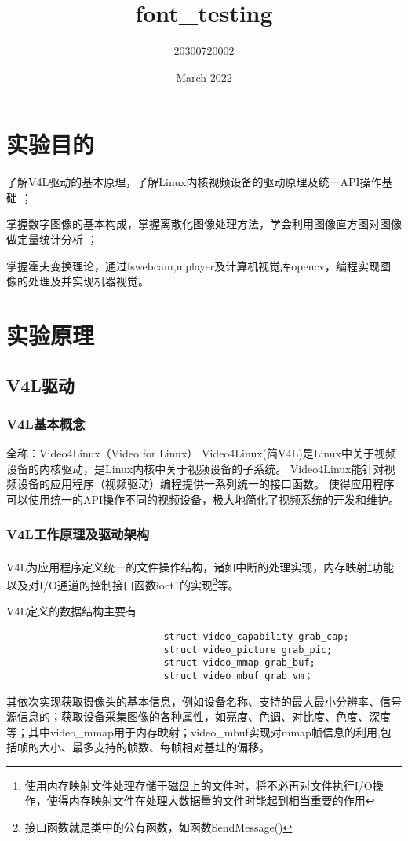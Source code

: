 \documentclass{article}
\title{font_testing}
\author{20300720002 }
\date{March 2022}
\begin{document}
\section{实验目的}
了解V4L驱动的基本原理，了解Linux内核视频设备的驱动原理及统一API操作基础
；

掌握数字图像的基本构成，掌握离散化图像处理方法，学会利用图像直方图对图像做定量统计分析
；

掌握霍夫变换理论，通过fswebcam,mplayer及计算机视觉库opencv，编程实现图像的处理及并实现机器视觉。



\section{实验原理}

\subsection{V4L驱动
}

\subsubsection{V4L基本概念}
全称：Video4Linux（Video for Linux）
Video4Linux(简V4L)是Linux中关于视频设备的内核驱动，是Linux内核中关于视频设备的子系统。
Video4Linux能针对视频设备的应用程序（视频驱动）编程提供一系列统一的接口函数。
使得应用程序可以使用统一的API操作不同的视频设备，极大地简化了视频系统的开发和维护。
\subsubsection{V4L工作原理及驱动架构}
V4L为应用程序定义统一的文件操作结构，诸如中断的处理实现，内存映射\footnote{使用内存映射文件处理存储于磁盘上的文件时，将不必再对文件执行I/O操作，使得内存映射文件在处理大数据量的文件时能起到相当重要的作用}功能以及对I/O通道的控制接口函数ioct1的实现\footnote{接口函数就是类中的公有函数，如函数SendMessage()}等。

V4L定义的数据结构主要有

\begin{lstlisting}
                            struct video_capability grab_cap;
                            struct video_picture grab_pic;
                            struct video_mmap grab_buf;
                            struct video_mbuf grab_vm；      
\end{lstlisting}

其依次实现获取摄像头的基本信息，例如设备名称、支持的最大最小分辨率、信号源信息的；获取设备采集图像的各种属性，如亮度、色调、对比度、色度、深度等；其中video\_mmap用于内存映射；video\_mbuf实现对mmap帧信息的利用,包括帧的大小、最多支持的帧数、每帧相对基址的偏移。
\end{document}

